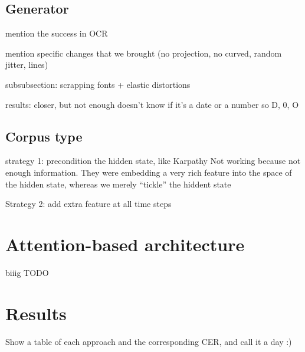 	\subsection{Generator}

		mention the success in OCR

		mention specific changes that we brought (no projection, no curved, random jitter, lines)

		subsubsection: scrapping fonts + elastic distortions

		results:  closer, but not enough doesn't know if it's a date or a number so D, 0, O


	\subsection{Corpus type}
		strategy 1: precondition the hidden state, like Karpathy
		Not working because not enough information. They were embedding a very rich feature into the space of the hidden state, whereas we merely ``tickle'' the hiddent state

		Strategy 2: add extra feature at all time steps


\section{Attention-based architecture}\label{sec:attention}
	biiig TODO


\section{Results}\label{sec:transcription_results}

		Show a table of each approach and the corresponding CER, and call it a day :)

\stopToDo{}

